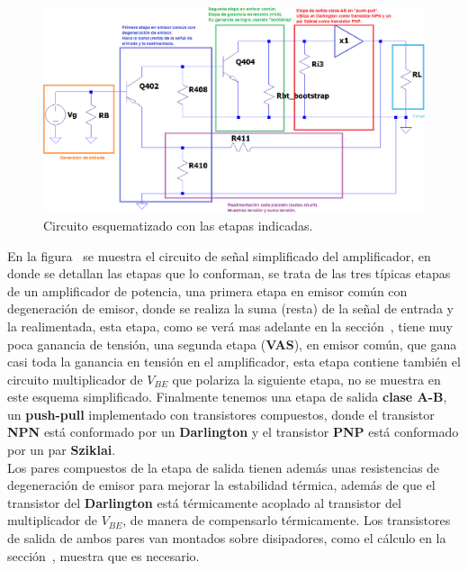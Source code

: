 

\begin{figure}[H] %
\begin{center}
\includegraphics[width=0.9 \textwidth, angle=0]{./img/desarrollo/0_etapas.png}
\caption{\label{fig:fig_complete_circuit_stages}\footnotesize{Circuito esquematizado con las etapas indicadas.}}
\end{center}
\end{figure}



En la figura~ se muestra el circuito de señal simplificado del amplificador, en donde se detallan las etapas que lo conforman, se trata de las tres típicas etapas de un amplificador de potencia, una primera etapa en emisor común con degeneración de emisor, donde se realiza la suma (resta) de la señal de entrada y la realimentada, esta etapa, como se verá mas adelante en la sección~, tiene muy poca ganancia de tensión, una segunda etapa (\textbf{VAS}), en emisor común, que gana casi toda la ganancia en tensión en el amplificador, esta etapa contiene también el circuito multiplicador de $V_{BE}$ que polariza la siguiente etapa, no se muestra en este esquema simplificado. Finalmente tenemos una etapa de salida \textbf{clase A-B}, un \textbf{push-pull} implementado con transistores compuestos, donde el transistor \textbf{NPN} está conformado por un \textbf{Darlington} y el transistor \textbf{PNP} está conformado por un par \textbf{Sziklai}.\\

Los pares compuestos de la etapa de salida tienen además unas resistencias de degeneración de emisor para mejorar la estabilidad térmica, además de que el transistor del \textbf{Darlington} está térmicamente acoplado al transistor del multiplicador de $V_{BE}$, de manera de compensarlo térmicamente. Los transistores de salida de ambos pares van montados sobre disipadores, como el cálculo en la sección~, muestra que es necesario.\\

